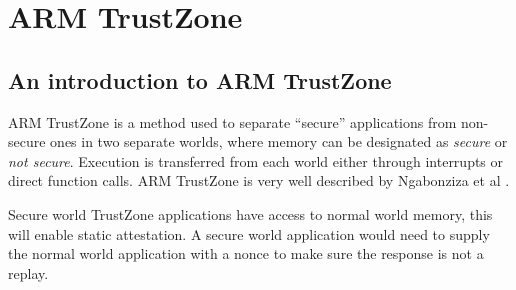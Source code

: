 \section{ARM TrustZone}

\subsection{An introduction to ARM TrustZone}

ARM TrustZone is a method used to separate “secure” applications from non-secure ones in two separate worlds, where memory can be designated as \textit{secure} or \textit{not secure}. Execution is transferred from each world either through interrupts or direct function calls. ARM TrustZone is very well described by Ngabonziza et al \cite{Ngabonziza2017}.

Secure world TrustZone applications have access to normal world memory, this will enable static attestation. A secure world application would need to supply the normal world application with a nonce to make sure the response is not a replay.